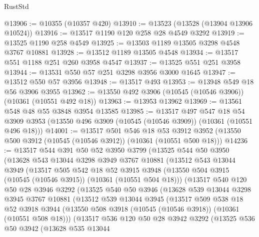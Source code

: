 \begin{lexlean}{RustStd}
\begin{coremodule}
@13906 := @10355 (@10357 @420)
@13910 := @13523 (@13528 (@13904 @13906 @10524))
@13916 := @13517 @1190 @120 @258 @28 @4549 @3292
@13919 := @13525 @1190 @258 @4549
@13925 := @13503 @1189 @13505 @3298 @4548 @3767 @10881
@13928 := @13512 @1189 @13505 @4548
@13934 := @13517 @551 @1188 @251 @260 @3958 @4547
@13937 := @13525 @551 @251 @3958
@13944 := @13531 @550 @57 @251 @3298 @3956 @3000 @1645
@13947 := @13512 @550 @57 @3956
@13948 := @13517 @493
@13953 := @13948 @549 @18 @56 @3906 @3955
@13962 := @13550 @492 @3906 (@10545 (@10546 @3906)) (@10361 (@10551 @492 @18))
@13963 := @13953 @13962
@13969 := @13561 @548 @48 @55 @3848 @3954 @13585
@13985 := @13517
    @497
    @547
    @18
    @54
    @3909
    @3953
    (@13550 @496 @3909 (@10545 (@10546 @3909)) (@10361 (@10551 @496 @18)))
@14001 := @13517
    @501
    @546
    @18
    @53
    @3912
    @3952
    (@13550 @500 @3912 (@10545 (@10546 @3912)) (@10361 (@10551 @500 @18)))
@14236 := @13517
    @544
    @391
    @50
    @52
    @3950
    @3799
    (@13525
      @544
      @50
      @3950
      (@13628
        @543
        @13044
        @3298
        @3949
        @3767
        @10881
        (@13512
          @543
          @13044
          @3949
          (@13517
            @505
            @542
            @18
            @52
            @3915
            @3948
            (@13550 @504 @3915 (@10545 (@10546 @3915)) (@10361 (@10551 @504 @18)))
            (@13517
              @540
              @120
              @50
              @28
              @3946
              @3292
              (@13525
                @540
                @50
                @3946
                (@13628
                  @539
                  @13044
                  @3298
                  @3945
                  @3767
                  @10881
                  (@13512
                    @539
                    @13044
                    @3945
                    (@13517
                      @509
                      @538
                      @18
                      @52
                      @3918
                      @3944
                      (@13550 @508 @3918 (@10545 (@10546 @3918)) (@10361 (@10551 @508 @18)))
                      (@13517
                        @536
                        @120
                        @50
                        @28
                        @3942
                        @3292
                        (@13525
                          @536
                          @50
                          @3942
                          (@13628
                            @535
                            @13044

\end{coremodule}
\end{lexlean}
